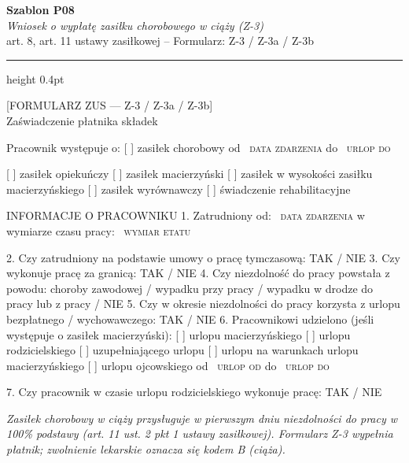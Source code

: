 \documentclass[11pt,a4paper]{article}
\newcommand{\Pole}[1]{%
  \textcolor{szary}{\dotfill}\,%
  {\scriptsize\textcolor{szary}{\textsc{#1}}}%
}
\begin{document}
\begin{flushright}
{\footnotesize\color{szary}
\textbf{Szablon P08}\\
{\itshape Wniosek o wypłatę zasiłku chorobowego w ciąży (Z-3)}\\
art. 8, art. 11 ustawy zasiłkowej -- Formularz: Z-3 / Z-3a / Z-3b}\
\end{flushright}

\vspace{0.5em}
{\color{ramka}\hrule height 0.4pt}
\vspace{0.8em}

[FORMULARZ ZUS --- Z-3 / Z-3a / Z-3b]\\[-2pt]
Zaświadczenie płatnika składek

Pracownik występuje o:
[ ] zasiłek chorobowy            od \Pole{data zdarzenia} do \Pole{urlop do}
[ ] zasiłek opiekuńczy
[ ] zasiłek macierzyński
[ ] zasiłek w wysokości zasiłku macierzyńskiego
[ ] zasiłek wyrównawczy
[ ] świadczenie rehabilitacyjne

INFORMACJE O PRACOWNIKU
1. Zatrudniony od: \Pole{data zdarzenia}     w wymiarze czasu pracy: \Pole{wymiar etatu}
2. Czy zatrudniony na podstawie umowy o pracę tymczasową: TAK / NIE
3. Czy wykonuje pracę za granicą: TAK / NIE
4. Czy niezdolność do pracy powstała z powodu: choroby zawodowej / wypadku
przy pracy / wypadku w drodze do pracy lub z pracy / NIE
5. Czy w okresie niezdolności do pracy korzysta z urlopu bezpłatnego /
wychowawczego: TAK / NIE
6. Pracownikowi udzielono (jeśli występuje o zasiłek macierzyński):
[ ] urlopu macierzyńskiego      [ ] urlopu rodzicielskiego
[ ] uzupełniającego urlopu       [ ] urlopu na warunkach urlopu macierzyńskiego
[ ] urlopu ojcowskiego
od \Pole{urlop od} do \Pole{urlop do}
7. Czy pracownik w czasie urlopu rodzicielskiego wykonuje pracę: TAK / NIE

\vfill
{\footnotesize\textcolor{szary}\itshape Zasiłek chorobowy w ciąży przysługuje w pierwszym dniu niezdolności do pracy w 100\% podstawy (art. 11 ust. 2 pkt 1 ustawy zasiłkowej). Formularz Z-3 wypełnia płatnik; zwolnienie lekarskie oznacza się kodem B (ciąża). }
\end{document}

